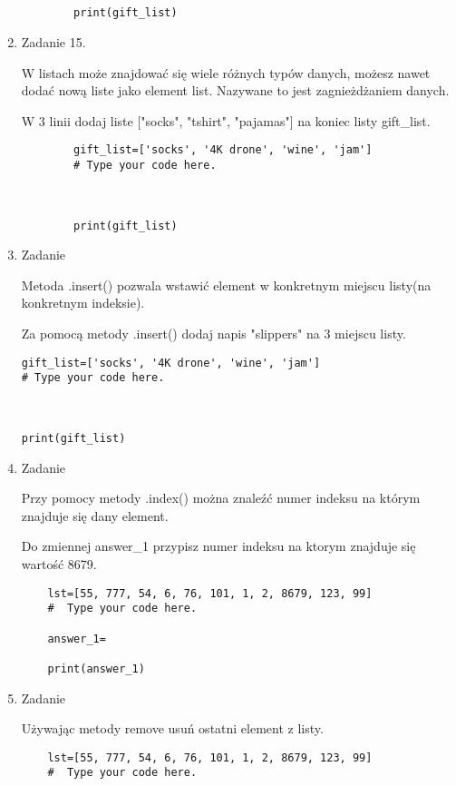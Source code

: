 \documentclass[11pt]{article}
\begin{document}
\begin{enumerate}
\begin{lstlisting}
		
		
		print(gift_list)
	\end{lstlisting}

	\item
	\begin{Large}
		Zadanie 15.
	\end{Large}
	\par
	W listach może znajdować się wiele różnych typów danych, możesz nawet dodać nową liste jako element list. Nazywane to jest zagnieżdżaniem danych.
	\par
	W 3 linii dodaj liste  ["socks", "tshirt", "pajamas"] na koniec listy gift\_list.
	\begin{lstlisting}
		gift_list=['socks', '4K drone', 'wine', 'jam']
		# Type your code here.
		
		
		
		print(gift_list)
	\end{lstlisting}

	\item
\begin{Large}
	Zadanie
\end{Large}
\par
Metoda .insert() pozwala wstawić element w konkretnym miejscu listy(na konkretnym indeksie).
\par
Za pomocą metody .insert() dodaj napis "slippers" na 3 miejscu listy.
\begin{lstlisting}
gift_list=['socks', '4K drone', 'wine', 'jam']
# Type your code here.



print(gift_list)
\end{lstlisting}

	\item
\begin{Large}
	Zadanie
\end{Large}
\par
Przy pomocy metody .index() można znaleźć numer indeksu na którym znajduje się dany element.
\par
Do zmiennej answer\_1 przypisz numer indeksu na ktorym znajduje się wartość 8679.
\begin{lstlisting}	
	lst=[55, 777, 54, 6, 76, 101, 1, 2, 8679, 123, 99]
	#  Type your code here.
	
	answer_1=
	
	print(answer_1)
\end{lstlisting}

	\item
\begin{Large}
	Zadanie
\end{Large}
\par
Używając metody remove usuń ostatni element z listy.
\begin{lstlisting}	
	lst=[55, 777, 54, 6, 76, 101, 1, 2, 8679, 123, 99]
	#  Type your code here.
	

\end{lstlisting}
\end{enumerate}
\end{document}
